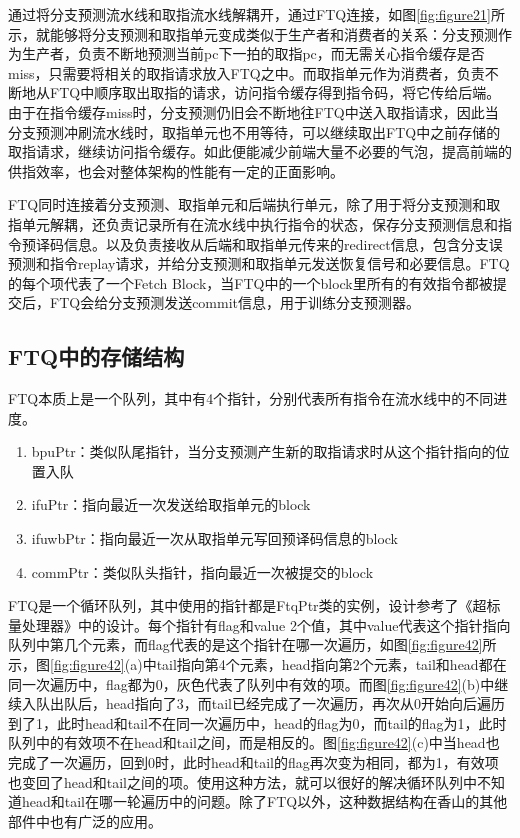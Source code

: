 通过将分支预测流水线和取指流水线解耦开，通过FTQ连接，如图\ref{fig:figure21}所示，就能够将分支预测和取指单元变成类似于生产者和消费者的关系：分支预测作为生产者，负责不断地预测当前pc下一拍的取指pc，而无需关心指令缓存是否miss，只需要将相关的取指请求放入FTQ之中。而取指单元作为消费者，负责不断地从FTQ中顺序取出取指的请求，访问指令缓存得到指令码，将它传给后端。由于在指令缓存miss时，分支预测仍旧会不断地往FTQ中送入取指请求，因此当分支预测冲刷流水线时，取指单元也不用等待，可以继续取出FTQ中之前存储的取指请求，继续访问指令缓存。如此便能减少前端大量不必要的气泡，提高前端的供指效率，也会对整体架构的性能有一定的正面影响。

FTQ同时连接着分支预测、取指单元和后端执行单元，除了用于将分支预测和取指单元解耦，还负责记录所有在流水线中执行指令的状态，保存分支预测信息和指令预译码信息。以及负责接收从后端和取指单元传来的redirect信息，包含分支误预测和指令replay请求，并给分支预测和取指单元发送恢复信号和必要信息。FTQ的每个项代表了一个Fetch Block，当FTQ中的一个block里所有的有效指令都被提交后，FTQ会给分支预测发送commit信息，用于训练分支预测器。

\subsection{FTQ中的存储结构}

FTQ本质上是一个队列，其中有4个指针，分别代表所有指令在流水线中的不同进度。

\begin{enumerate}
	\item bpuPtr：类似队尾指针，当分支预测产生新的取指请求时从这个指针指向的位置入队
	\item ifuPtr：指向最近一次发送给取指单元的block
	\item ifuwbPtr：指向最近一次从取指单元写回预译码信息的block
	\item commPtr：类似队头指针，指向最近一次被提交的block
\end{enumerate}

FTQ是一个循环队列，其中使用的指针都是FtqPtr类的实例，设计参考了《超标量处理器》中的设计\cite{superscala}。每个指针有flag和value 2个值，其中value代表这个指针指向队列中第几个元素，而flag代表的是这个指针在哪一次遍历，如图\ref{fig:figure42}所示，图\ref{fig:figure42}(a)中tail指向第4个元素，head指向第2个元素，tail和head都在同一次遍历中，flag都为0，灰色代表了队列中有效的项。而图\ref{fig:figure42}(b)中继续入队出队后，head指向了3，而tail已经完成了一次遍历，再次从0开始向后遍历到了1，此时head和tail不在同一次遍历中，head的flag为0，而tail的flag为1，此时队列中的有效项不在head和tail之间，而是相反的。图\ref{fig:figure42}(c)中当head也完成了一次遍历，回到0时，此时head和tail的flag再次变为相同，都为1，有效项也变回了head和tail之间的项。使用这种方法，就可以很好的解决循环队列中不知道head和tail在哪一轮遍历中的问题。除了FTQ以外，这种数据结构在香山的其他部件中也有广泛的应用。


